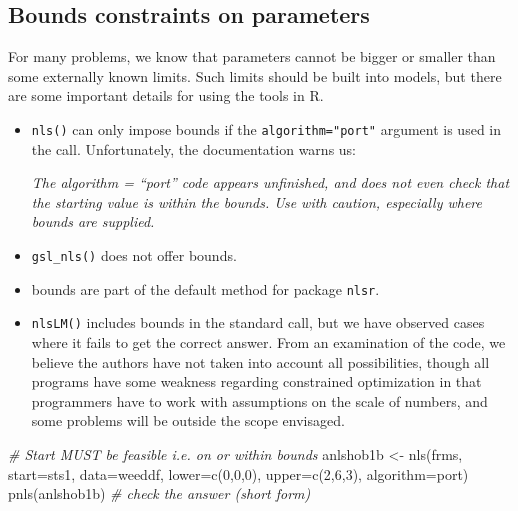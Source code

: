 \documentclass[
]{article}
\newenvironment{Shaded}{\begin{snugshade}}{\end{snugshade}}
\newcommand{\AttributeTok}[1]{\textcolor[rgb]{0.77,0.63,0.00}{#1}}
\newcommand{\CommentTok}[1]{\textcolor[rgb]{0.56,0.35,0.01}{\textit{#1}}}
\newcommand{\DecValTok}[1]{\textcolor[rgb]{0.00,0.00,0.81}{#1}}
\newcommand{\FunctionTok}[1]{\textcolor[rgb]{0.00,0.00,0.00}{#1}}
\newcommand{\NormalTok}[1]{#1}
\newcommand{\OtherTok}[1]{\textcolor[rgb]{0.56,0.35,0.01}{#1}}
\newcommand{\StringTok}[1]{\textcolor[rgb]{0.31,0.60,0.02}{#1}}
\begin{document}
\hypertarget{bounds-constraints-on-parameters}{%
\subsection{Bounds constraints on
parameters}\label{bounds-constraints-on-parameters}}

For many problems, we know that parameters cannot be bigger or smaller
than some externally known limits. Such limits should be built into
models, but there are some important details for using the tools in R.

\begin{itemize}
\item
  \texttt{nls()} can only impose bounds if the \texttt{algorithm="port"}
  argument is used in the call. Unfortunately, the documentation warns
  us:

  \emph{The algorithm = ``port'' code appears unfinished, and does not
  even check that the starting value is within the bounds. Use with
  caution, especially where bounds are supplied.}
\item
  \texttt{gsl\_nls()} does not offer bounds.
\item
  bounds are part of the default method for package \texttt{nlsr}.
\item
  \texttt{nlsLM()} includes bounds in the standard call, but we have
  observed cases where it fails to get the correct answer. From an
  examination of the code, we believe the authors have not taken into
  account all possibilities, though all programs have some weakness
  regarding constrained optimization in that programmers have to work
  with assumptions on the scale of numbers, and some problems will be
  outside the scope envisaged.
\end{itemize}

\begin{Shaded}
\begin{Highlighting}[]
\CommentTok{\# Start MUST be feasible i.e. on or within bounds}
\NormalTok{anlshob1b }\OtherTok{\textless{}{-}} \FunctionTok{nls}\NormalTok{(frms, }\AttributeTok{start=}\NormalTok{sts1, }\AttributeTok{data=}\NormalTok{weeddf, }\AttributeTok{lower=}\FunctionTok{c}\NormalTok{(}\DecValTok{0}\NormalTok{,}\DecValTok{0}\NormalTok{,}\DecValTok{0}\NormalTok{),}
             \AttributeTok{upper=}\FunctionTok{c}\NormalTok{(}\DecValTok{2}\NormalTok{,}\DecValTok{6}\NormalTok{,}\DecValTok{3}\NormalTok{), }\AttributeTok{algorithm=}\StringTok{\textquotesingle{}port\textquotesingle{}}\NormalTok{)}
\FunctionTok{pnls}\NormalTok{(anlshob1b) }\CommentTok{\#  check the answer (short form)}
\end{Highlighting}
\end{Shaded}
\end{document}
